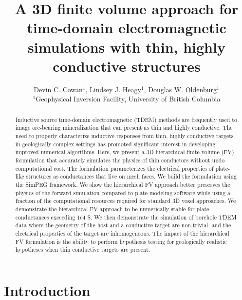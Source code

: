 \documentclass{segabs}
\begin{document}
\title{A 3D finite volume approach for time-domain electromagnetic simulations with thin, highly conductive structures}
\author{
Devin C. Cowan$^1$, Lindsey J. Heagy$^1$, Douglas W. Oldenburg$^1$ \\
$^1$Geophysical Inversion Facility, University of British Columbia \\
}
\maketitle

\begin{abstract}

\vspace{-15pt}
Inductive source time-domain electromagnetic (TDEM) methods are frequently used to image ore-bearing mineralization that can present as thin and highly conductive. The need to properly characterize inductive responses from thin, highly conductive targets in geologically complex settings has promoted significant interest in developing improved numerical algorithms. Here, we present a 3D hierarchical finite volume (FV) formulation that accurately simulates the physics of thin conductors without undo computational cost. The formulation parameterizes the electrical properties of plate-like structures as conductances that live on mesh faces. We build the formulation using the SimPEG framework. We show the hierarchical FV approach better preserves the physics of the forward simulation compared to plate-modeling software while using a fraction of the computational resources required for standard 3D voxel approaches. We demonstrate the hierarchical FV approach to be numerically stable for plate conductances exceeding 1e4 S. We then demonstrate the simulation of borehole TDEM data where the geometry of the host and a conductive target are non-trivial, and the electrical properties of the target are inhomogeneous. The impact of the hierarchical FV formulation is the ability to perform hypothesis testing for geologically realistic hypotheses when thin conductive targets are present.
\end{abstract}

\vspace{-15pt}
\section{Introduction}
\end{document}
